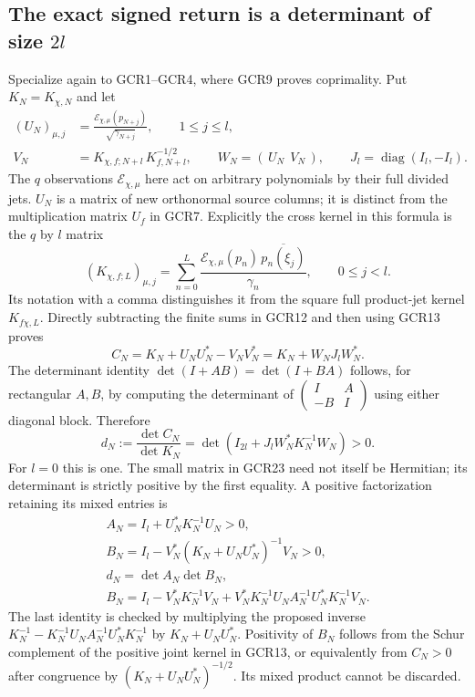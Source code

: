 \subsection{The exact signed return is a determinant of size $2l$}

Specialize again to GCR1--GCR4, where GCR9 proves coprimality.
Put $K_N=K_{\chi,N}$ and let
\[
\begin{split}
 (U_N)_{\mu,j}
   &=\frac{\mathcal E_{\chi,\mu}(p_{N+j})}
                                  {\sqrt{\gamma_{N+j}}},
                    \qquad 1\leq j\leq l,\\
 V_N&=K_{\chi,f;N+l}\,K_{f,N+l}^{-1/2},\qquad
 W_N=(\,U_N\ \ V_N\,),\qquad
 J_l=\operatorname{diag}(I_l,-I_l).
\end{split}\tag{GCR21}
\]
The $q$ observations $\mathcal E_{\chi,\mu}$ here act on arbitrary
polynomials by their full divided jets. $U_N$ is a matrix of
new orthonormal source columns; it is distinct from the
multiplication matrix $U_f$ in GCR7. Explicitly the cross kernel
in this formula is the $q$ by $l$ matrix
\[
 (K_{\chi,f;L})_{\mu,j}
    =\sum_{n=0}^L
       \frac{\mathcal E_{\chi,\mu}(p_n)\,
                         \overline{p_n(\xi_j)}}{\gamma_n},
       \qquad 0\leq j<l.
\]
Its notation with a comma distinguishes it from the square
full product-jet kernel $K_{f\chi,L}$. Directly subtracting the
finite sums in GCR12 and then using GCR13 proves
\[
 C_N=K_N+U_NU_N^*-V_NV_N^*
        =K_N+W_NJ_lW_N^*.
\tag{GCR22}
\]
The determinant identity $\det(I+AB)=\det(I+BA)$ follows, for
rectangular $A,B$, by computing the determinant of
$\left(\begin{smallmatrix}I&A\\-B&I\end{smallmatrix}\right)$
using either diagonal block. Therefore
\[
 d_N:=\frac{\det C_N}{\det K_N}
       =\det\!\left(I_{2l}+J_lW_N^*K_N^{-1}W_N\right)>0.
\tag{GCR23}
\]
For $l=0$ this is one. The small matrix in GCR23 need not itself
be Hermitian; its determinant is strictly positive by the
first equality. A positive factorization retaining its mixed
entries is
\[
\begin{gathered}
 A_N=I_l+U_N^*K_N^{-1}U_N>0,\\
 B_N=I_l-V_N^*(K_N+U_NU_N^*)^{-1}V_N>0,\\
 d_N=\det A_N\det B_N,\\
 B_N=I_l-V_N^*K_N^{-1}V_N
       +V_N^*K_N^{-1}U_N A_N^{-1}U_N^*K_N^{-1}V_N .
\end{gathered}\tag{GCR24}
\]
The last identity is checked by multiplying the proposed inverse
$K_N^{-1}-K_N^{-1}U_N A_N^{-1}U_N^*K_N^{-1}$
by $K_N+U_NU_N^*$. Positivity of $B_N$ follows from the
Schur complement of the positive joint kernel in GCR13,
or equivalently from $C_N>0$ after congruence by
$(K_N+U_NU_N^*)^{-1/2}$. Its mixed product cannot be discarded.

